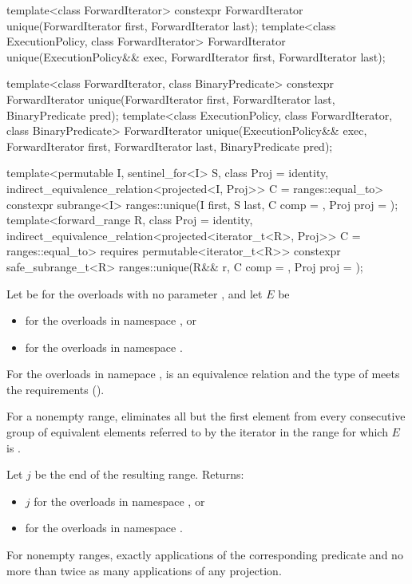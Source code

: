 %
\begin{itemdecl}
template<class ForwardIterator>
  constexpr ForwardIterator unique(ForwardIterator first, ForwardIterator last);
template<class ExecutionPolicy, class ForwardIterator>
  ForwardIterator unique(ExecutionPolicy&& exec,
                         ForwardIterator first, ForwardIterator last);

template<class ForwardIterator, class BinaryPredicate>
  constexpr ForwardIterator unique(ForwardIterator first, ForwardIterator last,
                                   BinaryPredicate pred);
template<class ExecutionPolicy, class ForwardIterator, class BinaryPredicate>
  ForwardIterator unique(ExecutionPolicy&& exec,
                         ForwardIterator first, ForwardIterator last,
                         BinaryPredicate pred);

template<permutable I, sentinel_for<I> S, class Proj = identity,
         indirect_equivalence_relation<projected<I, Proj>> C = ranges::equal_to>
  constexpr subrange<I> ranges::unique(I first, S last, C comp = {}, Proj proj = {});
template<forward_range R, class Proj = identity,
         indirect_equivalence_relation<projected<iterator_t<R>, Proj>> C = ranges::equal_to>
  requires permutable<iterator_t<R>>
  constexpr safe_subrange_t<R>
    ranges::unique(R&& r, C comp = {}, Proj proj = {});
\end{itemdecl}

\begin{itemdescr}
\pnum
Let  be 
for the overloads with no parameter , and
let $E$ be
\begin{itemize}
\setlength{\emergencystretch}{1em}
\item
  for the overloads in namespace , or
\item
  for the overloads in namespace .
\end{itemize}

\pnum
\expects
For the overloads in namepace ,
 is an equivalence relation and
the type of  meets
the  requirements ().

\pnum
\effects
For a nonempty range, eliminates all but the first element
from every consecutive group of equivalent elements referred to
by the iterator  in the range 
for which $E$ is .

\pnum
\returns
Let $j$ be the end of the resulting range. Returns:
\begin{itemize}
\item $j$ for the overloads in namespace , or
\item {} for the overloads in namespace .
\end{itemize}

\pnum
\complexity
For nonempty ranges, exactly  applications
of the corresponding predicate and
no more than twice as many applications of any projection.
\end{itemdescr}

